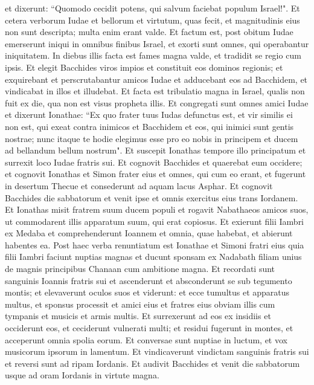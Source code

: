 \begin{biblechapter}
\verse et dixerunt: “Quomodo cecidit potens, qui salvum faciebat populum Israel!". 
\verse Et cetera verborum Iudae et bellorum et virtutum, quas fecit, et magnitudinis eius non sunt descripta; multa enim erant valde. 
\verse Et factum est, post obitum Iudae emerserunt iniqui in omnibus finibus Israel, et exorti sunt omnes, qui operabantur iniquitatem. 
\verse In diebus illis facta est fames magna valde, et tradidit se regio cum ipsis. 
\verse Et elegit Bacchides viros impios et constituit eos dominos regionis; 
\verse et exquirebant et perscrutabantur amicos Iudae et adducebant eos ad Bacchidem, et vindicabat in illos et illudebat. 
\verse Et facta est tribulatio magna in Israel, qualis non fuit ex die, qua non est visus propheta illis. 
\verse Et congregati sunt omnes amici Iudae et dixerunt Ionathae: 
\verse “Ex quo frater tuus Iudas defunctus est, et vir similis ei non est, qui exeat contra inimicos et Bacchidem et eos, qui inimici sunt gentis nostrae; 
\verse nunc itaque te hodie elegimus esse pro eo nobis in principem et ducem ad bellandum bellum nostrum". 
\verse Et suscepit Ionathas tempore illo principatum et surrexit loco Iudae fratris sui. 
\verse Et cognovit Bacchides et quaerebat eum occidere; 
\verse et cognovit Ionathas et Simon frater eius et omnes, qui cum eo erant, et fugerunt in desertum Thecue et consederunt ad aquam lacus Asphar. 
\verse Et cognovit Bacchides die sabbatorum et venit ipse et omnis exercitus eius trans Iordanem. 
\verse Et Ionathas misit fratrem suum ducem populi et rogavit Nabathaeos amicos suos, ut commodarent illis apparatum suum, qui erat copiosus. 
\verse Et exierunt filii Iambri ex Medaba et comprehenderunt Ioannem et omnia, quae habebat, et abierunt habentes ea. 
\verse Post haec verba renuntiatum est Ionathae et Simoni fratri eius quia filii Iambri faciunt nuptias magnas et ducunt sponsam ex Nadabath filiam unius de magnis principibus Chanaan cum ambitione magna. 
\verse Et recordati sunt sanguinis Ioannis fratris sui et ascenderunt et absconderunt se sub tegumento montis; 
\verse et elevaverunt oculos suos et viderunt: et ecce tumultus et apparatus multus, et sponsus processit et amici eius et fratres eius obviam illis cum tympanis et musicis et armis multis. 
\verse Et surrexerunt ad eos ex insidiis et occiderunt eos, et ceciderunt vulnerati multi; et residui fugerunt in montes, et acceperunt omnia spolia eorum. 
\verse Et conversae sunt nuptiae in luctum, et vox musicorum ipsorum in lamentum. 
\verse Et vindicaverunt vindictam sanguinis fratris sui et reversi sunt ad ripam Iordanis. 
\verse Et audivit Bacchides et venit die sabbatorum usque ad oram Iordanis in virtute magna. 

\end{biblechapter}
